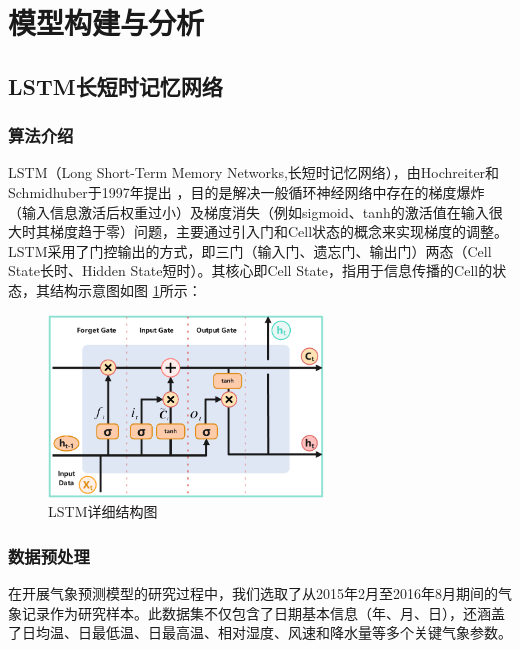 \section{模型构建与分析}

\subsection{LSTM长短时记忆网络}
\label{subsec:lstm}

\subsubsection{算法介绍}

LSTM（Long Short-Term Memory Networks,长短时记忆网络），由Hochreiter和Schmidhuber于1997年提出 \cite{LSTM_Hochrerter}，目的是解决一般循环神经网络中存在的梯度爆炸（输入信息激活后权重过小）及梯度消失（例如sigmoid、tanh的激活值在输入很大时其梯度趋于零）问题，主要通过引入门和Cell状态的概念来实现梯度的调整。LSTM采用了门控输出的方式，即三门（输入门、遗忘门、输出门）两态（Cell State长时、Hidden State短时）。其核心即Cell State，指用于信息传播的Cell的状态，其结构示意图如图 \ref{fig:a-0}所示：

\begin{figure}[ht]
  \centering
  \includegraphics[width=0.65\textwidth]{./Img/LSTM解释结构图.pdf}
  \caption{LSTM详细结构图}\label{fig:a-0}
\end{figure}


\subsubsection{数据预处理}

在开展气象预测模型的研究过程中，我们选取了从2015年2月至2016年8月期间的气象记录作为研究样本。此数据集不仅包含了日期基本信息（年、月、日），还涵盖了日均温、日最低温、日最高温、相对湿度、风速和降水量等多个关键气象参数。

